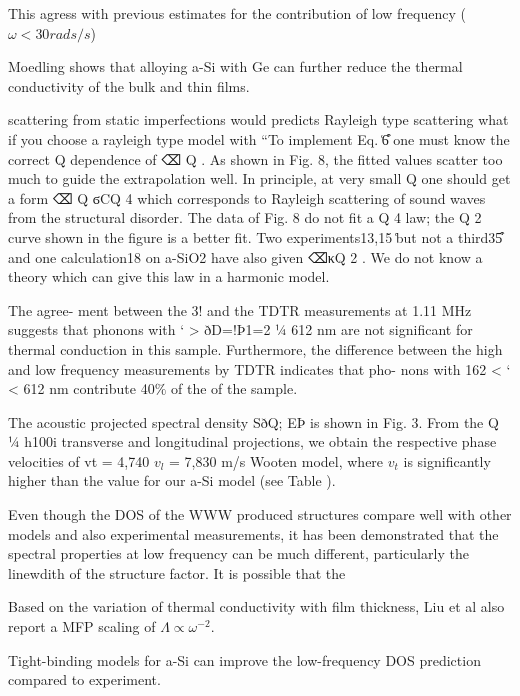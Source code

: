 \documentclass[aps,prb,twocolumn,superscriptaddress,footinbib,amsmath,amssymb,floatfix]{revtex4}
\begin{document}
This agress with previous estimates for the contribution of low 
frequency ($\omega<30 rads/s$) \cite{love_estimate_1990}

Moedling shows that alloying a-Si with Ge can further reduce 
the thermal conductivity of the bulk and thin films.
\cite{bouchard_vibrational_1988,feldman_thermal_1993} 

scattering from static imperfections would predicts Rayleigh type 
scattering \cite{klemens_scattering_1955}
what if you choose a rayleigh type model with 
``To implement Eq. ͑6͒ one must know the
correct Q dependence of ⌫ Q . As shown in Fig. 8, the fitted
values scatter too much to guide the extrapolation well. In
principle, at very small Q one should get a form ⌫ Q ϭCQ 4
which corresponds to Rayleigh scattering of sound waves
from the structural disorder. The data of Fig. 8 do not fit a
Q 4 law; the Q 2 curve shown in the figure is a better fit. Two
experiments13,15 ͑but not a third35͒ and one calculation18 on
a-SiO2 have also given ⌫κQ 2 . We do not know a theory
which can give this law in a harmonic model.

The agree-
ment between the 3! and the TDTR measurements at
1.11 MHz suggests that phonons with ‘ > ðD=!Þ1=2 1⁄4
612 nm are not significant for thermal conduction in this
sample. Furthermore, the difference between the high and
low frequency measurements by TDTR indicates that pho-
nons with 162 < ‘ < 612 nm contribute 40$\%$ of the of
the sample.\cite{liu_high_2009}

The acoustic projected spectral density SðQ; EÞ is shown
in Fig. 3. From the Q 1⁄4 h100i transverse and longitudinal
projections, we obtain the respective phase velocities of
vt = 4,740 $v_l$ = 7,830 m/s Wooten model, where $v_t$ is 
significantly higher than the value for our a-Si model 
(see Table ).\cite{liu_high_2009} 

Even though the DOS of the WWW produced structures compare well with 
other models and also experimental measurements, it has been 
demonstrated that the spectral properties at low frequency can be 
much different, particularly the linewdith of the structure 
factor.\cite{liu_high_2009} It is possible that the 

Based on the variation of thermal conductivity with film thickness, 
Liu et al also report a MFP scaling of 
$\Lambda \propto \omega^{-2}$.\cite{liu_high_2009} 

Tight-binding models for a-Si can improve the low-frequency 
DOS prediction compared to experiment.\cite{feldman_tight-binding_2004}
\end{document}
